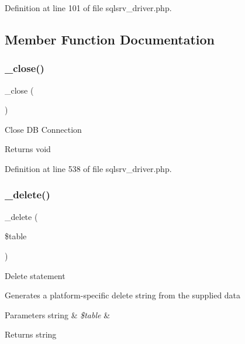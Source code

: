 Definition at line 101 of file sqlsrv\+\_\+driver.\+php.



\subsection{Member Function Documentation}
\mbox{\label{class_c_i___d_b__sqlsrv__driver_a4d9082658000e5ede8312067c6dda9db}} 
\subsubsection{\texorpdfstring{\_close()}{\_close()}}
{\footnotesize\ttfamily \+\_\+close (\begin{DoxyParamCaption}{ }\end{DoxyParamCaption})\hspace{0.3cm}{\ttfamily [protected]}}

Close DB Connection

\begin{DoxyReturn}{Returns}
void 
\end{DoxyReturn}


Definition at line 538 of file sqlsrv\+\_\+driver.\+php.

\mbox{\label{class_c_i___d_b__sqlsrv__driver_a133ea8446ded52589bd22cc9163d0896}} 
\subsubsection{\texorpdfstring{\_delete()}{\_delete()}}
{\footnotesize\ttfamily \+\_\+delete (\begin{DoxyParamCaption}\item[{}]{\$table }\end{DoxyParamCaption})\hspace{0.3cm}{\ttfamily [protected]}}

Delete statement

Generates a platform-\/specific delete string from the supplied data


\begin{DoxyParams}[1]{Parameters}
string & {\em \$table} & \\
\hline
\end{DoxyParams}
\begin{DoxyReturn}{Returns}
string 
\end{DoxyReturn}


